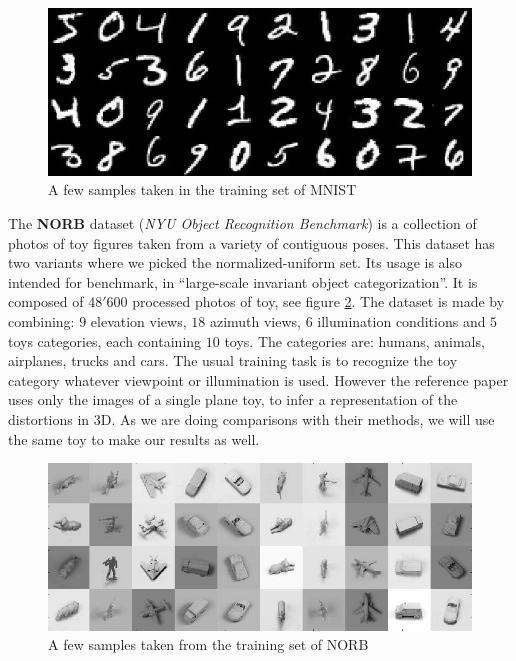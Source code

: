 \documentclass[a4paper,12pt]{report}
\begin{document}
\begin{figure}[t]
    \begin{center}
        \includegraphics{thesis_figures/mnist.jpg}
    \end{center}
    \caption{A few samples taken in the training set of MNIST}
    \label{fig:mnist}
\end{figure}

The {\bf NORB} dataset ({\em NYU Object Recognition Benchmark}) is a collection of photos of toy figures taken from a variety of contiguous poses.
This dataset has two variants where we picked the normalized-uniform set.
Its usage is also intended for benchmark, in ``large-scale invariant object categorization''.
It is composed of $48'600$ processed photos of toy, see figure \ref{fig:norb}.
The dataset is made by combining: $9$ elevation views, $18$ azimuth views, $6$ illumination conditions and $5$ toys categories, each containing $10$ toys.
The categories are: humans, animals, airplanes, trucks and cars.
The usual training task is to recognize the toy category whatever viewpoint or illumination is used.
However the reference paper uses only the images of a single plane toy, to infer a representation of the distortions in 3D.
As we are doing comparisons with their methods, we will use the same toy to make our results as well.

\begin{figure}[t]
    \begin{center}
        \includegraphics{thesis_figures/norb.jpg}
    \end{center}
    \caption{A few samples taken from the training set of NORB}
    \label{fig:norb}
\end{figure}
\end{document}
